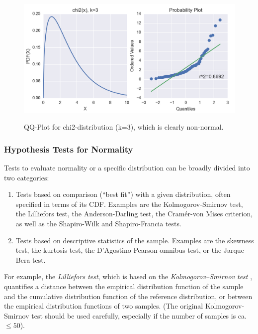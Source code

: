\begin{figure}
  \centering
  \includegraphics[width=1.0\textwidth]{../Images/chi2pp.png}\\
  \caption{QQ-Plot for chi2-distribution (k=3), which is clearly non-normal.}\label{fig:qqplot}
\end{figure}

\subsubsection{Hypothesis Tests for Normality}

Tests to evaluate normality or a specific distribution can be broadly divided into two categories:

\begin{enumerate}
  \item Tests based on comparison (“best fit”) with a given distribution, often specified in terms of its CDF. Examples are the Kolmogorov-Smirnov test, the Lilliefors test, the Anderson-Darling test, the Cramér-von Mises criterion, as well as the Shapiro-Wilk and Shapiro-Francia tests.
  \item Tests based on descriptive statistics of the sample. Examples are the skewness test, the kurtosis test, the D’Agostino-Pearson omnibus test, or the Jarque-Bera test.
\end{enumerate}

For example, the \emph{Lilliefors test}, which is based on the \emph{Kolmogorov--Smirnov test} , quantifies a distance between the empirical distribution function of the sample and the cumulative distribution function of the reference distribution, or between the empirical distribution functions of two samples. (The original Kolmogorov-Smirnov test should be used carefully, especially if the number of samples is ca. $\leq 50$).

